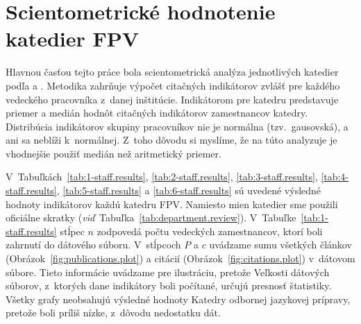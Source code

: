 \section{Scientometrické hodnotenie katedier FPV}

Hlavnou časťou tejto práce bola scientometrická analýza jednotlivých katedier
podľa \citet{Kazakis2014a} a \citet{Kazakis2014b,Kazakis2015}.  Metodika
zahrňuje výpočet citačných indikátorov zvlášť pre každého vedeckého pracovníka
z~danej inštitúcie.  Indikátorom pre katedru predstavuje priemer a medián hodnôt
citačných indikátorov zamestnancov katedry.  Distribúcia indikátorov skupiny
pracovníkov nie je normálna (tzv.~gausovská), a ani sa neblíži k~normálnej.
Z~toho dôvodu si myslíme, že na túto analyzuje je vhodnejšie použiť medián než
aritmetický priemer.

V~Tabuľkách~\ref{tab:1-staff.results}, \ref{tab:2-staff.results},
\ref{tab:3-staff.results}, \ref{tab:4-staff.results}, \ref{tab:5-staff.results}
a \ref{tab:6-staff.results} sú uvedené výsledné hodnoty indikátorov každú
katedru FPV.  Namiesto mien katedier sme použili oficiálne skratky
(\emph{viď}~Tabuľka~\ref{tab:department.review}).
V~Tabuľke~\ref{tab:1-staff.results} stĺpec $n$ zodpovedá počtu vedeckých
zamestnancov, ktorí boli zahrnutí do dátového súboru.  V~stĺpcoch $P$ a $c$
uvádzame sumu všetkých článkov (Obrázok~\ref{fig:publications.plot}) a citácií
(Obrázok~\ref{fig:citations.plot}) v~dátovom súbore.  Tieto informácie uvádzame
pre ilustráciu, pretože Veľkosti dátových súborov, z~ktorých dane indikátory
boli počítané, určujú presnosť štatistiky.  Všetky grafy neobsahujú výsledné
hodnoty Katedry odbornej jazykovej prípravy, pretože boli príliš nízke, z~dôvodu
nedostatku dát.

